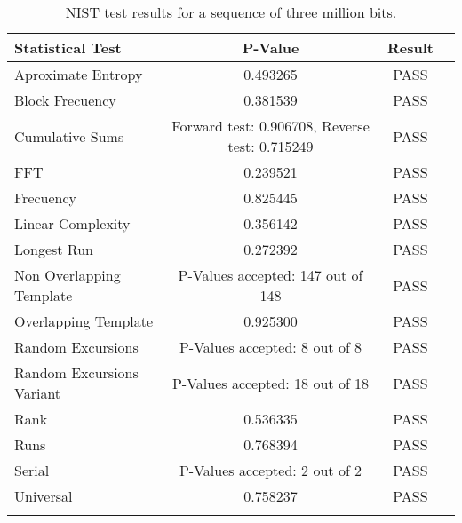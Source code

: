 \documentclass{article}
\begin{document}
 

\onecolumn




\vskip 0.3in


\begin{table}[!h]
\caption{NIST test results for  a sequence of three million bits.}
\label{sample-table}
\vskip 0.15in
\begin{center}
\begin{small}
\begin{sc}
\begin{tabular}{lccr}
\hline
\abovespace\belowspace
Statistical Test &  P-Value  & Result \\
\hline
\abovespace
Aproximate Entropy    &  0.493265   & PASS  \\
\abovespace
Block Frecuency  &  0.381539 &  PASS \\
\abovespace
Cumulative Sums    &   Forward test: 0.906708, Reverse test: 0.715249   & PASS \\
\abovespace
FFT    &  0.239521  &   PASS     \\
\abovespace
Frecuency     &  0.825445  &  PASS  \\
\abovespace
Linear Complexity      &  0.356142 & PASS \\
\abovespace
Longest Run      &  0.272392   &    PASS     \\
\abovespace
Non Overlapping Template      & P-Values accepted: 147 out of 148    &    PASS      \\
\abovespace
Overlapping Template      &  0.925300  &        PASS      \\
\abovespace
Random Excursions      &   P-Values accepted: 8 out of 8    &     PASS         \\
\abovespace
Random Excursions Variant  &   P-Values accepted: 18 out of 18     &    PASS      \\
\abovespace
Rank &    0.536335      &       PASS     \\
\abovespace
Runs &        0.768394   &     PASS       \\
\abovespace
Serial &     P-Values accepted: 2 out of 2     &     PASS      \\
\abovespace
\belowspace
Universal &    0.758237  &   PASS          \\

\hline
\abovespace


\end{tabular}
\end{sc}
\end{small}
\end{center}
\vskip -0.1in
\end{table}
\end{document}
